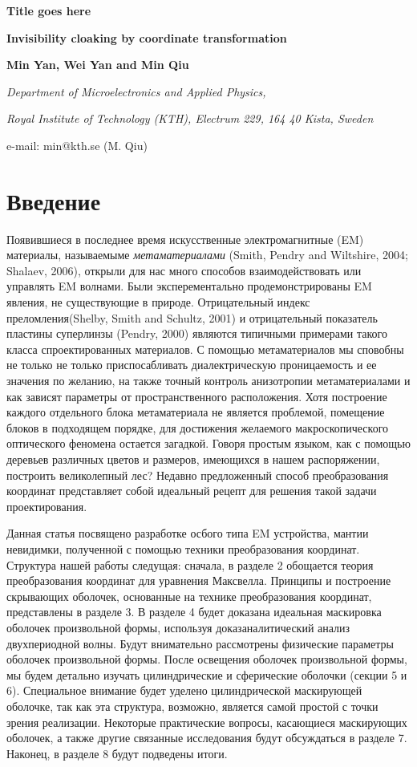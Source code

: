 \documentclass[12pt,a4paper]{article}
\newcommand{\tit}[1]{\begin{center}{\bf{\Large #1}}\end{center}}
\newcommand{\aut}[1]{\centerline{{\bf #1}}}
\newcommand{\cityorg}[1]{\centerline{\it #1}}
\newcommand{\email}[1]{\centerline{{\small e-mail: #1}}\vspace{\baselineskip}}
\begin{document}
\sloppy

 \tit{Title goes here}
 \tit{Invisibility cloaking by coordinate transformation}
 \aut{Min Yan, Wei Yan and Min Qiu}
 \cityorg{Department of Microelectronics and Applied Physics,}
 \cityorg{Royal Institute of Technology (KTH), Electrum 229, 164 40 Kista, Sweden}
 \email{min@kth.se (M. Qiu)}

\section{Введение}
Появившиеся в последнее время искусственные электромагнитные (EM) материалы, называемыме 
\textit{метаматериалами} (Smith, Pendry and Wiltshire, 2004; Shalaev, 2006), открыли для нас
много способов взаимодействовать или управлять EM волнами. Были эксперементально продемонстрированы EM
явления, не существующие в природе. Отрицательный индекс преломления(Shelby, Smith and Schultz, 2001)
и отрицательный показатель пластины суперлинзы (Pendry, 2000) являются типичными примерами такого класса
спроектированных материалов. С помощью метаматериалов мы сповобны не только не только приспосабливать 
диалектрическую проницаемость и ее значения по желанию, на также точный контроль анизотропии 
метаматериалами и как зависят параметры от пространственного расположения. Хотя построение каждого 
отдельного блока метаматериала не является проблемой, помещение блоков в подходящем порядке, для 
достижения желаемого макроскопического оптического феномена остается загадкой. Говоря простым языком,
как с помощью деревьев различных цветов и размеров, имеющихся в нашем распоряжении, построить великолепный
лес? Недавно предложенный способ преобразования координат представляет собой идеальный рецепт для
решения такой задачи проектирования.

Данная статья посвящено разработке осбого типа EM устройства, мантии невидимки, полученной с помощью
техники преобразования координат. Структура нашей работы следущая: сначала, в разделе 2 обощается
теория преобразования координат для уравнения Максвелла. Принципы и построение скрывающих оболочек,
основанные на технике преобразования координат, представлены в разделе 3. В разделе 4 будет доказана
идеальная маскировка оболочек произвольной формы, используя доказаналитический анализ двухпериодной волны.
Будут внимательно рассмотрены физические параметры оболочек произвольной формы. После освещения
оболочек произвольной формы, мы будем детально изучать цилиндрические и сферические оболочки 
(секции 5 и 6). Специальное внимание будет уделено цилиндрической маскирующей оболочке, так как эта 
структура, возможно, является самой простой с точки зрения реализации. Некоторые практические вопросы,
касающиеся маскирующих оболочек, а также другие связанные исследования будут обсуждаться в разделе 7.
Наконец, в разделе 8 будут подведены итоги.
\end{document}
